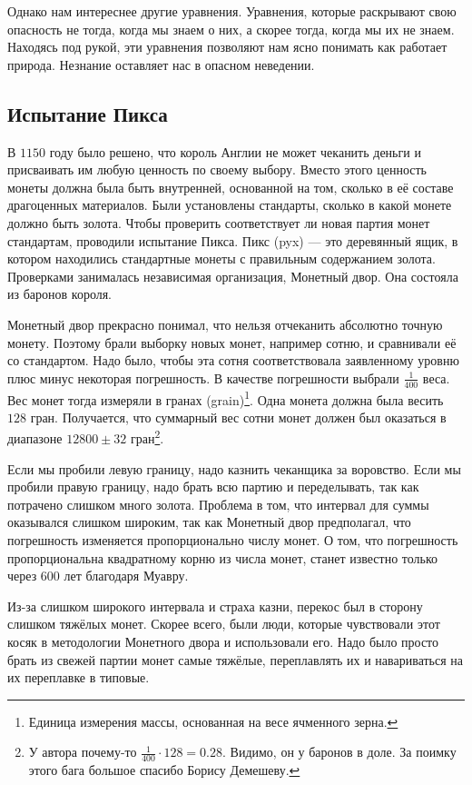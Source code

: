 \documentclass[12pt, a4paper, oneside]{article}
\begin{document}
Однако нам интереснее другие уравнения. Уравнения, которые раскрывают свою опасность не тогда, когда мы знаем о них, а скорее тогда, когда мы их не знаем. Находясь под рукой, эти уравнения позволяют нам ясно понимать как работает природа. Незнание оставляет нас в опасном неведении. 

\subsection{Испытание Пикса}

В $1150$ году было решено, что король Англии не может чеканить деньги и присваивать им любую ценность по своему выбору. Вместо этого ценность монеты должна была быть внутренней, основанной на том, сколько в её составе драгоценных материалов. Были установлены стандарты, сколько в какой монете должно быть золота. Чтобы проверить соответствует ли новая партия монет стандартам, проводили испытание Пикса. Пикс (pyx) --- это деревянный ящик, в котором находились стандартные монеты с правильным содержанием золота. Проверками занималась независимая организация, Монетный двор. Она состояла из баронов короля.

Монетный двор прекрасно понимал, что нельзя отчеканить абсолютно точную монету. Поэтому брали выборку новых монет, например сотню, и сравнивали её со стандартом. Надо было, чтобы эта сотня соответствовала заявленному уровню плюс минус некоторая погрешность. В качестве погрешности выбрали $\frac{1}{400}$ веса. Вес монет тогда измеряли в гранах (grain)\footnote{Единица измерения массы, основанная на весе ячменного зерна.}. Одна монета должна была весить $128$ гран. Получается, что суммарный вес сотни монет должен был оказаться в диапазоне $12800 \pm 32$ гран\footnote{У автора почему-то $ \tfrac{1}{400}\cdot 128 = 0.28.$ Видимо, он у баронов в доле. За поимку этого бага большое спасибо Борису Демешеву.}. 

Если мы пробили левую границу, надо казнить чеканщика за воровство. Если мы пробили правую границу, надо брать всю партию и переделывать, так как потрачено слишком много золота. Проблема в том, что интервал для суммы оказывался слишком широким, так как Монетный двор предполагал, что погрешность изменяется пропорционально числу монет. О том, что погрешность пропорциональна квадратному корню из числа монет, станет известно только через $600$ лет благодаря Муавру.

Из-за слишком широкого интервала и страха казни, перекос был в сторону слишком тяжёлых монет. Скорее всего, были люди, которые чувствовали этот косяк в методологии Монетного двора и использовали его. Надо было просто брать из свежей партии монет самые тяжёлые, переплавлять их и навариваться на их переплавке в типовые.  
\end{document}
